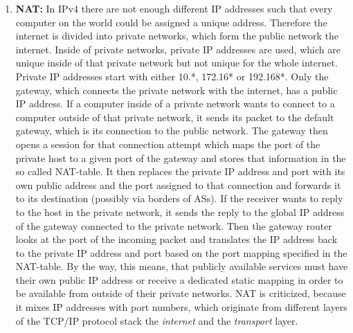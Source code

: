 \begin{enumerate}
      \item \textbf{\acf{NAT}:} In \ac{IP}v4 there are not enough different IP addresses such that every computer on the world could be assigned a unique address. Therefore the internet is divided into private networks, which form the public network \textendash{} the internet. Inside of private networks, private IP addresses are used, which are unique inside of that private network but not unique for the whole internet. Private IP addresses start with either 10.*, 172.16* or 192.168*. Only the gateway, which connects the private network with the internet, has a public IP address. If a computer inside of a private network wants to connect to a computer outside of that private network, it sends its packet to the default gateway, which is its connection to the public network. The gateway then opens a session for that connection attempt which maps the port of the private host to a given port of the gateway and stores that information in the so called \ac{NAT}-table. It then replaces the private IP address and port with its own public address and the port assigned to that connection and forwards it to its destination (possibly via borders of \acl{AS}s). If the receiver wants to reply to the host in the private network, it sends the reply to the global IP address of the gateway connected to the private network. Then the gateway router looks at the port of the incoming packet and translates the IP address back to the private IP address and port based on the port mapping specified in the \ac{NAT}-table. By the way, this means, that publicly available services must have their own public IP address or receive a dedicated static mapping in order to be available from outside of their private networks. \ac{NAT} is criticized, because it mixes IP addresses with port numbers, which originate from different layers of the \ac{TCP}/\ac{IP} protocol stack \textendash{} the \textit{internet} and the \textit{transport} layer.

\end{enumerate}
